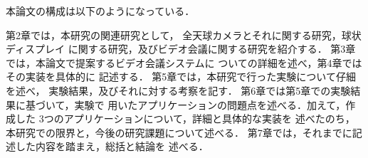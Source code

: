本論文の構成は以下のようになっている．

第2章では，本研究の関連研究として，
全天球カメラとそれに関する研究，球状ディスプレイ
に関する研究，及びビデオ会議に関する研究を紹介する．
第3章では，本論文で提案するビデオ会議システムに
ついての詳細を述べ，第4章ではその実装を具体的に
記述する．
第5章では，本研究で行った実験について仔細を述べ，
実験結果，及びそれに対する考察を記す．
第6章では第5章での実験結果に基づいて，実験で
用いたアプリケーションの問題点を述べる．加えて，作成した
3つのアプリケーションについて，詳細と具体的な実装を
述べたのち，本研究での限界と，今後の研究課題について述べる．
第7章では，それまでに記述した内容を踏まえ，総括と結論を
述べる．